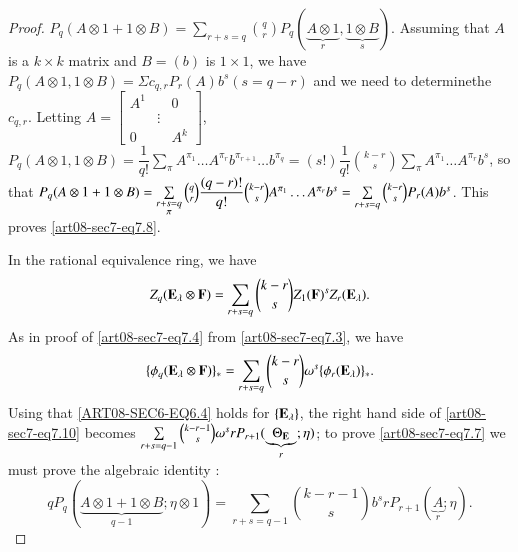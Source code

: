 \begin{proof}
$P_{q}(A\otimes 1+1\otimes B)=\sum\limits_{r+s=q}\binom{q}{r}P_{q}(\underbrace{A\otimes 1}_{r},\underbrace{1\otimes B}_{s})$. Assuming that $A$ is a $k\times k$ matrix and $B=(b)$ is $1\times 1$, we have $P_{q}(A\otimes 1,1\otimes B)=\Sigma c_{q,r}P_{r}(A)b^{s}(s=q-r)$ and we need to determine\pageoriginale the $c_{q,r}$. Letting $A=\left[\begin{smallmatrix} A^{1} & & 0\\  & \vdots &\\0 & & A^{k} \end{smallmatrix}\right]$, $P_{q}(A\otimes 1,1\otimes B)=\dfrac{1}{q!}\sum\limits_{\pi}A^{\pi_{1}}\ldots A^{\pi_{r}}b^{\pi_{r+1}}\ldots b^{\pi_{q}}=(s!)\dfrac{1}{q!}\binom{k-r}{s}\sum\limits_{\pi}A^{\pi_{1}}\ldots A^{\pi_{r}}b^{s}$, so that $P_{q}(A\otimes 1+1\otimes B)=\sum\limits_{\substack{r+s=q\\ \pi}}\break \binom{q}{r}\dfrac{(q-r)!}{q!}\binom{k-r}{s}A^{\pi_{1}}\ldots A^{\pi_{r}}b^{s}=\sum\limits_{r+s=q}\binom{k-r}{s}P_{r}(A)b^{s}$. This proves \eqref{art08-sec7-eq7.8}.

In the rational equivalence ring, we have
\begin{equation}
Z_{q}(\mathbf{E}_{\lambda}\otimes \mathbf{F})=\sum\limits_{r+s=q}\binom{k-r}{s}Z_{1}(\mathbf{F})^{s}Z_{r}(\mathbf{E}_{\lambda}).\label{art08-sec7-eq7.9}
\end{equation}
As in proof of \eqref{art08-sec7-eq7.4} from \eqref{art08-sec7-eq7.3}, we have
\begin{equation}
\{\phi_{q}(\mathbf{E}_{\lambda}\otimes \mathbf{F})\}_{\ast}=\sum\limits_{r+s=q}\binom{k-r}{s}\omega^{s}\{\phi_{r}(\mathbf{E}_{\lambda})\}_{*}.\label{art08-sec7-eq7.10}
\end{equation}
Using that \eqref{ART08-SEC6-EQ6.4} holds for $\{\mathbf{E}_{\lambda}\}$, the right hand side of \eqref{art08-sec7-eq7.10} becomes $\sum\limits_{r+s=q-1}\binom{k-r-1}{s}\omega^{s}rP_{r+1}(\underbrace{\Theta_{\mathbf{E}}}_{r};\eta)$; to prove \eqref{art08-sec7-eq7.7} we must prove the algebraic identity :
\begin{equation}
qP_{q}(\underbrace{A\otimes 1+1\otimes B}_{q-1};\eta\otimes 1)=\sum\limits_{r+s=q-1}\binom{k-r-1}{s}b^{s}rP_{r+1}(\underbrace{A}_{r};\eta).\label{art08-sec7-eq7.11}
\end{equation}
\end{proof}


